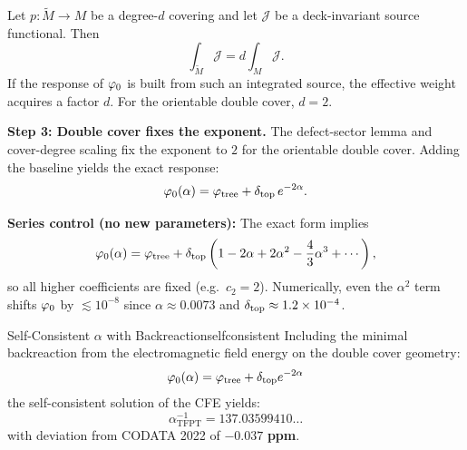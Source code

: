 \begin{tcolorbox}[colback=blue!3, colframe=blue!40, 
    title={\textbf{Lemma (Cover-Degree Scaling of Deck-Invariant Response)}}, fonttitle=\bfseries\small]
Let $p:\widetilde{M}\to M$ be a degree-$d$ covering and let $\mathcal{J}$ be a deck-invariant
source functional. Then
\begin{equation}
    \int_{\widetilde{M}}\mathcal{J} = d \int_{M}\mathcal{J}.
\end{equation}
If the response of $\varphi_0$ is built from such an integrated source, the effective
weight acquires a factor $d$. For the orientable double cover, $d=2$.
\end{tcolorbox}

\textbf{Step 3: Double cover fixes the exponent.}
The defect-sector lemma and cover-degree scaling fix the exponent to $2$ for the
orientable double cover. Adding the baseline yields the exact response:
\begin{equation}
    \varphi_0(\alpha) = \varphi_{\mathrm{tree}} + \delta_{\mathrm{top}}\,e^{-2\alpha}.
\end{equation}

\begin{remark}
\textbf{Series control (no new parameters):} The exact form implies
\begin{equation}
    \varphi_0(\alpha)=\varphi_{\mathrm{tree}}+\delta_{\mathrm{top}}\left(1-2\alpha+2\alpha^2-\frac{4}{3}\alpha^3+\cdots\right),
\end{equation}
so all higher coefficients are fixed (e.g.\ $c_2=2$). Numerically, even the
$\alpha^2$ term shifts $\varphi_0$ by $\lesssim 10^{-8}$ since
$\alpha\approx 0.0073$ and $\delta_{\mathrm{top}}\approx 1.2\times10^{-4}$.
\end{remark}

\begin{theorem}{Self-Consistent $\alpha$ with Backreaction}{selfconsistent}
Including the minimal backreaction from the electromagnetic field energy 
on the double cover geometry:
\begin{equation}
    \varphi_0(\alpha) = \varphi_{\mathrm{tree}} + \delta_{\mathrm{top}} e^{-2\alpha}
    \label{eq:backreaction}
\end{equation}
the self-consistent solution of the CFE yields:
\begin{equation}
    \boxed{\alpha^{-1}_{\text{TFPT}} = 137.03599410\ldots}
\end{equation}
with deviation from CODATA 2022 of $\mathbf{-0.037}$ \textbf{ppm}.
\end{theorem}

